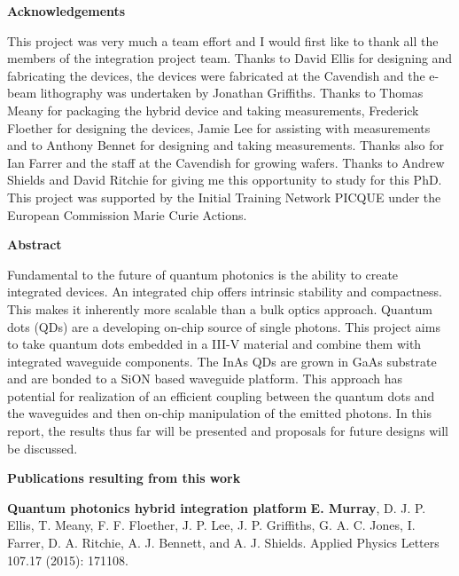 \documentclass[12pt, oneside]{book}
\begin{document}
\title{}  \author{} \date{}
\maketitle

\begin{center} \large \textbf{Acknowledgements} \end{center}

This project was very much a team effort and I would first like to thank all the
members of the integration project team. Thanks to David Ellis for designing and
fabricating the devices, the devices were fabricated at the Cavendish and the
e-beam lithography was undertaken by Jonathan Griffiths. Thanks to Thomas Meany
for packaging the hybrid device and taking measurements, Frederick Floether for
designing the devices, Jamie Lee for assisting with measurements and to Anthony
Bennet for designing and taking measurements. Thanks also for Ian Farrer and the
staff at the Cavendish for growing wafers. Thanks to Andrew Shields and David
Ritchie for giving me this opportunity to study for this PhD. This project was
supported by the Initial Training Network PICQUE under the European Commission
Marie Curie Actions.

\newpage \begin{center} \large \textbf{Abstract} \end{center}

Fundamental to the future of quantum photonics is the ability to create
integrated devices. An integrated chip offers intrinsic stability and
compactness. This makes it inherently more scalable than a bulk optics approach.
Quantum dots (QDs) are a developing on-chip source of single photons. This
project aims to take quantum dots embedded in a III-V material and combine them
with integrated waveguide components. The InAs QDs are grown in GaAs substrate
and are bonded to a SiON based waveguide platform. This approach has potential
for realization of an efficient coupling between the quantum dots and the
waveguides and then on-chip manipulation of the emitted photons. In this report,
the results thus far will be presented and proposals for future designs will be
discussed.

\newpage \large\textbf{Publications resulting from this work}

\small \textbf{Quantum photonics hybrid integration platform} \newline
\textbf{E. Murray}, D. J. P. Ellis, T. Meany, F. F. Floether, J. P. Lee, J. P.
Griffiths, G. A. C. Jones, I. Farrer, D. A. Ritchie, A. J. Bennett, and A. J.
Shields. \newline Applied Physics Letters 107.17 (2015): 171108.
\end{document}
